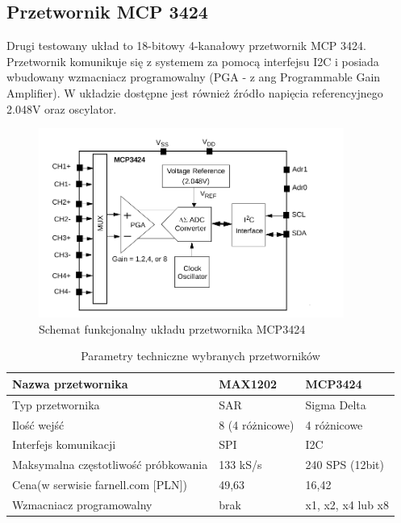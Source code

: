 \subsection{Przetwornik MCP 3424}

Drugi testowany układ to 18-bitowy 4-kanałowy przetwornik MCP 3424. Przetwornik komunikuje się z systemem za pomocą interfejsu I2C i posiada wbudowany wzmacniacz programowalny (PGA - z ang Programmable Gain Amplifier). W układzie dostępne jest również źródło napięcia referencyjnego 2.048V oraz oscylator.

\begin{figure}[h]
	\centering
		\includegraphics[width=10cm]{mcp3424_fun}
	\caption{Schemat funkcjonalny układu przetwornika MCP3424} 
	\label{fig:uxtouch}
\end{figure}


\begin{table}[t]
\label{tab3.1}
\begin{tabular}{|l|l|l|}

  \hline 
  Nazwa przetwornika & MAX1202 & MCP3424\\
  \hline
  Typ przetwornika & SAR & Sigma Delta\\
  \hline
  Ilość wejść & 8 (4 różnicowe)  & 4 różnicowe \\
  \hline 
  Interfejs komunikacji & SPI & I2C\\
  \hline
  Maksymalna częstotliwość próbkowania & 133 kS/s & 240 SPS (12bit) \\
  \hline
  Cena(w serwisie farnell.com [PLN]) & 49,63 & 16,42 \\
  \hline
  Wzmacniacz programowalny & brak & x1, x2, x4 lub x8 \\
  \hline
  
\end{tabular}
\caption{Parametry techniczne wybranych przetworników} 
\end{table}


